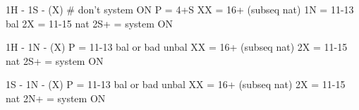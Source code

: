 1H - 1S - (X)  # don't system ON
    P = 4+S
    XX = 16+ (subseq nat)
    1N = 11-13 bal
    2X = 11-15 nat
    2S+ = system ON

1H - 1N - (X)
    P = 11-13 bal or bad unbal
    XX = 16+ (subseq nat)
    2X = 11-15 nat
    2S+ = system ON

1S - 1N - (X)
    P = 11-13 bal or bad unbal
    XX = 16+ (subseq nat)
    2X = 11-15 nat
    2N+ = system ON